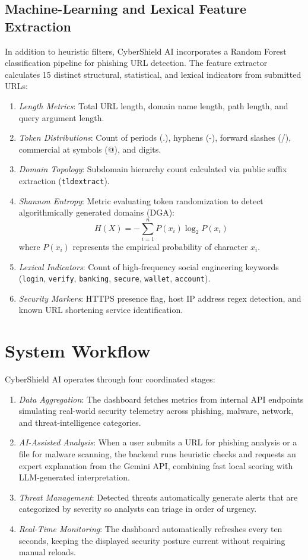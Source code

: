 \documentclass[conference]{IEEEtran}
\begin{document}
\subsection{Machine-Learning and Lexical Feature Extraction}
In addition to heuristic filters, CyberShield AI incorporates a Random Forest classification pipeline for phishing URL detection. The feature extractor calculates 15 distinct structural, statistical, and lexical indicators from submitted URLs:
\begin{enumerate}
    \item \textit{Length Metrics}: Total URL length, domain name length, path length, and query argument length.
    \item \textit{Token Distributions}: Count of periods (.), hyphens (-), forward slashes (/), commercial at symbols (@), and digits.
    \item \textit{Domain Topology}: Subdomain hierarchy count calculated via public suffix extraction (\texttt{tldextract}).
    \item \textit{Shannon Entropy}: Metric evaluating token randomization to detect algorithmically generated domains (DGA):
    \begin{equation}
    H(X) = -\sum_{i=1}^{n} P(x_i) \log_2 P(x_i)
    \end{equation}
    where $P(x_i)$ represents the empirical probability of character $x_i$.
    \item \textit{Lexical Indicators}: Count of high-frequency social engineering keywords (\texttt{login}, \texttt{verify}, \texttt{banking}, \texttt{secure}, \texttt{wallet}, \texttt{account}).
    \item \textit{Security Markers}: HTTPS presence flag, host IP address regex detection, and known URL shortening service identification.
\end{enumerate}

\section{System Workflow}
CyberShield AI operates through four coordinated stages:
\begin{enumerate}
    \item \textit{Data Aggregation}: The dashboard fetches metrics from internal API endpoints simulating real-world security telemetry across phishing, malware, network, and threat-intelligence categories.
    \item \textit{AI-Assisted Analysis}: When a user submits a URL for phishing analysis or a file for malware scanning, the backend runs heuristic checks and requests an expert explanation from the Gemini API, combining fast local scoring with LLM-generated interpretation.
    \item \textit{Threat Management}: Detected threats automatically generate alerts that are categorized by severity so analysts can triage in order of urgency.
    \item \textit{Real-Time Monitoring}: The dashboard automatically refreshes every ten seconds, keeping the displayed security posture current without requiring manual reloads.
\end{enumerate}
\end{document}
